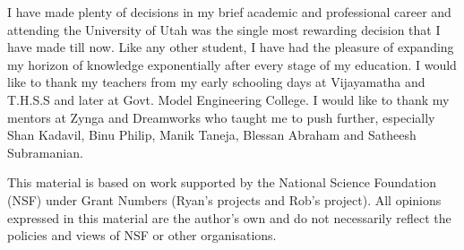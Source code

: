 I have made plenty of decisions in my brief academic and professional career and attending the University of Utah was the single most rewarding decision that I have made till now.
Like any other student, I have had the pleasure of expanding my horizon of knowledge exponentially after every stage of my education.
I would like to thank my teachers from my early schooling days at Vijayamatha and T.H.S.S and later at Govt. Model Engineering College.
I would like to thank my mentors at Zynga and Dreamworks who taught me to push further, especially Shan Kadavil, Binu Philip, Manik Taneja, Blessan Abraham and Satheesh Subramanian.

This material is based on work supported by the National Science Foundation (NSF)  under Grant Numbers (Ryan's projects and Rob's project).
All opinions expressed in this material are the author’s own and do not necessarily reflect the policies and views of NSF or other organisations.